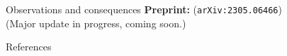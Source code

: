 \begin{frame}{Observations and consequences}
\pause
\textbf{Preprint: }\citet{giordano:2023:bayesij} (\texttt{arXiv:2305.06466})\\
(Major update in progress, coming soon.)
    
\end{frame}




\begin{frame}{References}

\footnotesize


\begingroup
\renewcommand{\section}[2]{}%

\endgroup

%
\end{frame}

